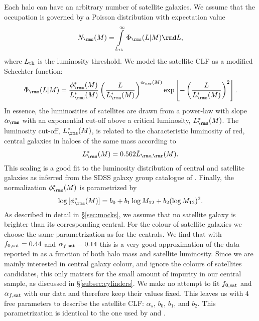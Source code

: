 \documentclass[fleqn,usenatbib,useAMS]{mnras}
\begin{document}
	Each halo can have an arbitrary number of satellite galaxies. We assume that the occupation is governed by a Poisson distribution with expectation value
	\begin{equation}\label{Nsat}
	N_\rms (M) = \int\limits_{L_{\rm th}}^\infty \Phi_\rms (L | M) \rmd L,
	\end{equation}
	where $L_{\rm th}$ is the luminosity threshold. We model the satellite CLF as a modified Schechter function:
	\begin{equation}\label{satCLF}
	\Phi_\rms (L | M) = \frac{\phi_\rms^* (M)}{L_\rms^*(M)} \left( \frac{L}{L_\rms^*(M)} \right)^{\alpha_\rms (M)} \exp \left[ - \left( \frac{L}{L_\rms^* (M)} \right)^2 \right].
	\end{equation}
	In essence, the luminosities of satellites are drawn from a power-law with slope $\alpha_\rms$ with an exponential cut-off above a critical luminosity, $L_\rms^*(M)$. The luminosity cut-off, $L_\rms^*(M)$, is related to the characteristic luminosity of red, central galaxies in haloes of the same mass according to
	\begin{equation}
	L_\rms^*(M) = 0.562 \tilde L_{\rmc, \rmr} (M).
	\end{equation}
	This scaling is a good fit to the luminosity distribution of central and satellite galaxies as inferred from the SDSS galaxy group catalogue of \citet{Yang+09}. Finally, the normalization $\phi_\rms^* (M)$ is parametrized by
	\begin{equation}
	\log \left[ \phi_\rms^* (M) \right] = b_0 + b_1 \log M_{12} + b_2 (\log M_{12})^2.
	\end{equation}
	As described in detail in \S\ref{sec:mocks}, we assume that no satellite galaxy is brighter than its corresponding central. For the colour of satellite galaxies we choose the same parametrization as for the centrals. We find that with $f_{0, \rm sat} = 0.44$ and $\alpha_{f, \rm sat} = 0.14$ this is a very good approximation of the data reported in \cite{Yang+08} as a function of both halo mass and satellite luminosity. Since we are mainly interested in central galaxy colour, and ignore the colours of satellites candidates, this only matters for the small amount of impurity in our central sample, as discussed in \S\ref{subsec:cylinders}. We make no attempt to fit $f_{0, \rm sat}$ and $\alpha_{f, \rm sat}$ with our data and therefore keep their values fixed. This leaves us with $4$ free parameters to describe the satellite CLF: $\alpha_s$, $b_0$, $b_1$, and $b_2$. This parametrization is identical to the one used by \cite{vdBosch+13} and \cite{Cacciato+13}.
	
\end{document}
